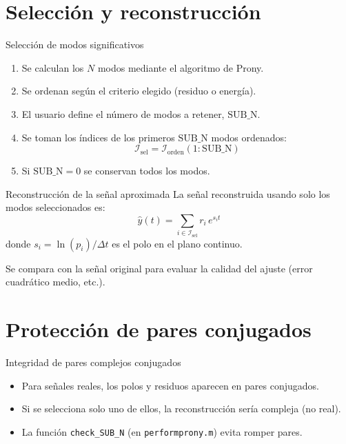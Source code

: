 \documentclass{beamer}
\begin{document}
\section{Selección y reconstrucción}

\begin{frame}{Selección de modos significativos}
\begin{enumerate}
  \item Se calculan los \(N\) modos mediante el algoritmo de Prony.
  \item Se ordenan según el criterio elegido (residuo o energía).
  \item El usuario define el número de modos a retener, \(\text{SUB\_N}\).
  \item Se toman los índices de los primeros \(\text{SUB\_N}\) modos ordenados:
  \[
  \mathcal{I}_{\text{sel}} = \mathcal{I}_{\text{orden}}(1:\text{SUB\_N})
  \]
  \item Si \(\text{SUB\_N}=0\) se conservan todos los modos.
\end{enumerate}
\end{frame}

\begin{frame}{Reconstrucción de la señal aproximada}
La señal reconstruida usando solo los modos seleccionados es:
\[
\hat{y}(t) = \sum_{i \in \mathcal{I}_{\text{sel}}} r_i \, e^{s_i t}
\]
donde \(s_i = \ln(p_i)/\Delta t\) es el polo en el plano continuo.
\vspace{0.3cm}

Se compara con la señal original para evaluar la calidad del ajuste (error cuadrático medio, etc.).
\end{frame}

\section{Protección de pares conjugados}

\begin{frame}{Integridad de pares complejos conjugados}
\begin{itemize}
  \item Para señales reales, los polos y residuos aparecen en pares conjugados.
  \item Si se selecciona solo uno de ellos, la reconstrucción sería compleja (no real).
  \item La función \texttt{check\_SUB\_N} (en \texttt{performprony.m}) evita romper pares.
\end{itemize}
\end{frame}
\end{document}
